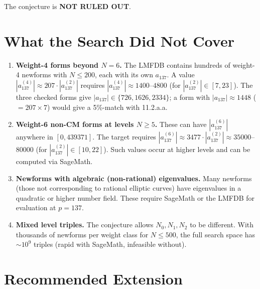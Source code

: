 \documentclass[12pt,a4paper]{article}
\begin{document}
The conjecture is \textbf{NOT RULED OUT}.

\section{What the Search Did Not Cover}

\begin{enumerate}
  \item \textbf{Weight-4 forms beyond $N=6$.}
    The LMFDB contains hundreds of weight-4 newforms with $N \le 200$, each
    with its own $a_{137}$.  A value $|a_{137}^{(4)}| \approx 207 \cdot |a_{137}^{(2)}|$
    requires $|a_{137}^{(4)}| \approx 1400$--$4800$ (for $|a_{137}^{(2)}| \in [7,23]$).
    The three checked forms give $|a_{137}| \in \{726, 1626, 2334\}$; a form with
    $|a_{137}| \approx 1448$ ($= 207 \times 7$) would give a 5\%-match with 11.2.a.a.

  \item \textbf{Weight-6 non-CM forms at levels $N \ge 5$.}
    These can have $|a_{137}^{(6)}|$ anywhere in $[0, 439371]$.
    The target requires $|a_{137}^{(6)}| \approx 3477 \cdot |a_{137}^{(2)}|
    \approx 35000$--$80000$ (for $|a_{137}^{(2)}| \in [10, 22]$).
    Such values occur at higher levels and can be computed via SageMath.

  \item \textbf{Newforms with algebraic (non-rational) eigenvalues.}
    Many newforms (those not corresponding to rational elliptic curves) have
    eigenvalues in a quadratic or higher number field.  These require SageMath
    or the LMFDB for evaluation at $p = 137$.

  \item \textbf{Mixed level triples.}
    The conjecture allows $N_0, N_1, N_2$ to be different.  With thousands of
    newforms per weight class for $N \le 500$, the full search space has
    $\sim 10^9$ triples (rapid with SageMath, infeasible without).
\end{enumerate}

\section{Recommended Extension}
\end{document}
